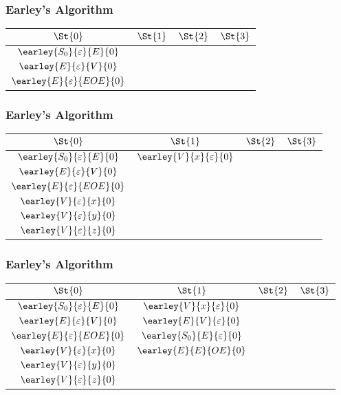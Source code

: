 \begin{frame}
	\frametitle{Earley's Algorithm}
	\centering
	\begin{tabular}{|c|c|c|c|}
		\hline
		$\St{0}$ & $\St{1}$ & $\St{2}$ & $\St{3}$ \\
		\hline
		$\earley{S_0}{\varepsilon}{E}{0}$ & & & \\
		$\earley{E}{\varepsilon}{V}{0}$   & & & \\
		$\earley{E}{\varepsilon}{EOE}{0}$ & & & \\
		\hline
	\end{tabular}
\end{frame}

\begin{frame}
	\frametitle{Earley's Algorithm}
	\centering
	\begin{tabular}{|c|c|c|c|}
		\hline
		$\St{0}$                          & $\St{1}$ & $\St{2}$ & $\St{3}$ \\
		\hline
		$\earley{S_0}{\varepsilon}{E}{0}$ & $\earley{V}{x}{\varepsilon}{0}$ & &\\
		$\earley{E}{\varepsilon}{V}{0}$   & & & \\
		$\earley{E}{\varepsilon}{EOE}{0}$ & & & \\
		$\earley{V}{\varepsilon}{x}{0}$   & & & \\
		$\earley{V}{\varepsilon}{y}{0}$   & & & \\
		$\earley{V}{\varepsilon}{z}{0}$   & & & \\
		\hline
	\end{tabular}
\end{frame}

\begin{frame}
	\frametitle{Earley's Algorithm}
	\centering
	\begin{tabular}{|c|c|c|c|}
		\hline
		$\St{0}$                          & $\St{1}$ & $\St{2}$ & $\St{3}$ \\
		\hline
		$\earley{S_0}{\varepsilon}{E}{0}$ & $\earley{V}{x}{\varepsilon}{0}$   &  & \\
		$\earley{E}{\varepsilon}{V}{0}$   & $\earley{E}{V}{\varepsilon}{0}$   &  & \\
		$\earley{E}{\varepsilon}{EOE}{0}$ & $\earley{S_0}{E}{\varepsilon}{0}$ &  & \\
		$\earley{V}{\varepsilon}{x}{0}$   & $\earley{E}{E}{OE}{0}$            &  & \\
		$\earley{V}{\varepsilon}{y}{0}$   &                                   &  & \\
		$\earley{V}{\varepsilon}{z}{0}$   &                                   &  & \\
		\hline
	\end{tabular}
\end{frame}


